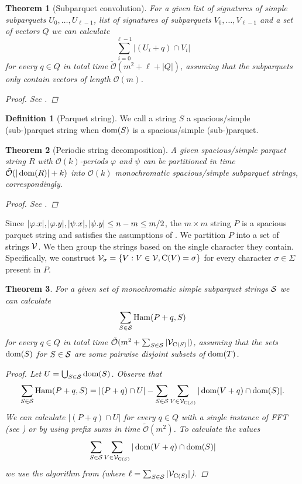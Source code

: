 \documentclass[11pt]{article}
\renewcommand{\O}{\mathcal{O}}
\newcommand{\tO}{\tilde{\mathcal{O}}}
\renewcommand{\phi}{\varphi}
\newcommand{\set}[1]{\left\lbrace #1 \right\rbrace}
\theoremstyle{plain}
\newtheorem{theorem}{Theorem}
\theoremstyle{definition}
\newtheorem{definition}{Definition}
\theoremstyle{remark}
\DeclareMathOperator*{\Ham}{Ham}
\begin{document}
\begin{theorem}[Subparquet convolution]\label{subparquet_convolution}
	For a given list of signatures of simple subparquets $U_0, \dots, U_{\ell - 1}$, list of signatures of subparquets $V_0, \dots, V_{\ell - 1}$ and a set of vectors $Q$ we can calculate
	$$ \sum_{i = 0}^{\ell - 1} |(U_i + q) \cap V_i| $$
	for every $q \in Q$ in total time $\tO(m^2 + \ell + |Q|)$, assuming that the subparquets only contain vectors of length $\O(m)$.
	\begin{proof} See . \end{proof}
\end{theorem}


\begin{definition}[Parquet string]
	We call a string $S$ a spacious/simple (sub-)parquet string when $\d{S}$ is a spacious/simple (sub-)parquet.
\end{definition}


\begin{theorem}[Periodic string decomposition]\label{parquet_decomposition}
	A given spacious/simple parquet string $R$ with $\O(k)$-periods $\phi$ and $\psi$ can be partitioned in time $\tO(|\d{R}| + k)$ into $\O(k)$ monochromatic spacious/simple subparquet strings, correspondingly.
	\begin{proof} See . \end{proof}
\end{theorem}


Since $|\x{\phi}|, |\y{\phi}|, |\x{\psi}|, |\y{\psi}| \le n - m \le m / 2$, the $m \times m$ string $P$ is a spacious parquet string and satisfies the assumptions of .
We partition $P$ into a set of strings $\V$.
We then group the strings based on the single character they contain.
Specifically, we construct $\V_\sigma = \set{V : V \in \V, \getchar{V} = \sigma}$ for every character $\sigma \in \Sigma$ present in $P$.


\begin{theorem}\label{sparse_algo}
	For a given set of monochromatic simple subparquet strings $\S$ we can calculate
	$$ \sum_{S \in \S} \Ham(P + q, S) $$
	for every $q \in Q$ in total time $\tO(m^2 + \sum_{S \in \S} |\V_{\getchar{S}}|)$, assuming that the sets $\d{S}$ for $S \in \S$ are some pairwise disjoint subsets of $\d{T}$.
	\begin{proof}
		Let $U = \bigcup_{S \in \S} \d{S}$. Observe that
		$$ \sum_{S \in \S} \Ham(P + q, S) = |(P + q) \cap U| - \sum_{S \in \S}\sum_{V \in \V_{\getchar{S}}} |\d{V + q} \cap \d{S}|.$$
		We can calculate $|(P + q) \cap U|$ for every $q \in Q$ with a single instance of FFT (see ) or by using prefix sums in time $\tO(m^2)$.
		To calculate the values
		$$ \sum_{S \in \S}\sum_{V \in \V_{\getchar{S}}} |\d{V + q} \cap \d{S}| $$
		we use the algorithm from  (where $\ell = \sum_{S \in \S} |\V_{\getchar{S}}|$).
	\end{proof}
\end{theorem}
\end{document}
